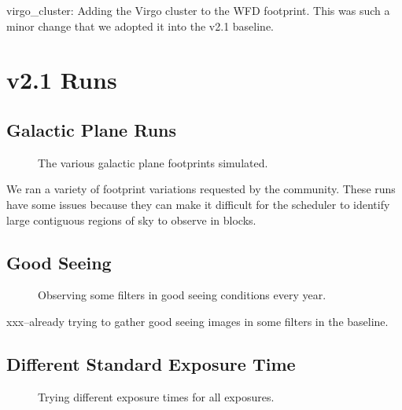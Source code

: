 virgo\_cluster:  Adding the Virgo cluster to the WFD footprint. This was such a minor change that we adopted it into the v2.1 baseline.


\section{v2.1 Runs}

\subsection{Galactic Plane Runs}

\begin{figure}
\caption{The various galactic plane footprints simulated.}
\end{figure}

We ran a variety of footprint variations requested by the community. These runs have some issues because they can make it difficult for the scheduler to identify large contiguous regions of sky to observe in blocks.

\subsection{Good Seeing}


\begin{figure}
\caption{Observing some filters in good seeing conditions every year. }
\end{figure}


xxx--already trying to gather good seeing images in some filters in the baseline.

\subsection{Different Standard Exposure Time}


\begin{figure}
\caption{Trying different exposure times for all exposures.  }
\end{figure}


